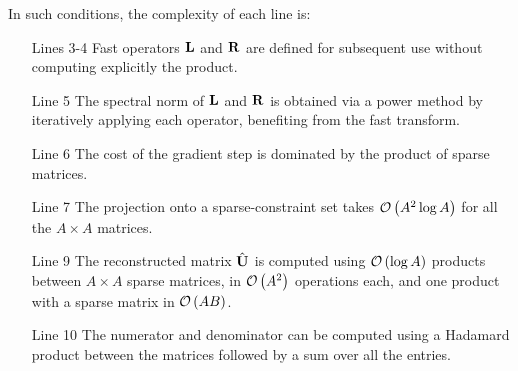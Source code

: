 In such conditions, the complexity of each line is:
\begin{itemize}
 \item [Lines 3-4] Fast operators ${\mathbf{L}}$ and ${\mathbf{R}}$ are defined for subsequent use without computing explicitly the product.
 \item [Line 5] The spectral norm of ${\mathbf{L}}$ and ${\mathbf{R}}$ is obtained via a power method by iteratively applying each operator, benefiting from the fast transform.
 \item [Line 6] The cost of the gradient step is dominated by the product of sparse matrices.
\item [Line 7] The projection onto a sparse-constraint set takes $\mathcal{O}\left (A^2\log A\right )$ for all the $A\times A$ matrices.
 \item [Line 9] The reconstructed matrix $\hat {{\mathbf{U}}}$ is computed using $\mathcal{O}\left (\log A\right )$ products between $A\times A$ sparse matrices, in $\mathcal{O}\left (A^2\right )$ operations each, and one product with a sparse matrix in $\mathcal{O}\left (AB\right )$.
 \item [Line 10] The numerator and denominator can be computed using a Hadamard product between the matrices followed by a sum over all the entries.
\end{itemize}
